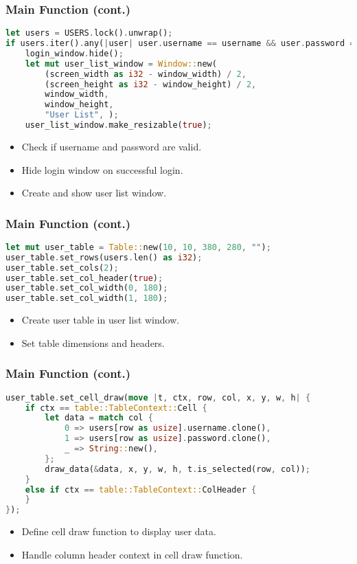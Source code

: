 \documentclass[aspectratio=169, table]{beamer}
\begin{document}
\begin{frame}[fragile]
	\frametitle{Main Function (cont.)}
	\vspace{15pt}
	\begin{lstlisting}[language=Rust]
let users = USERS.lock().unwrap();
if users.iter().any(|user| user.username == username && user.password == password) {
	login_window.hide();
	let mut user_list_window = Window::new(
		(screen_width as i32 - window_width) / 2,
		(screen_height as i32 - window_height) / 2,
		window_width,
		window_height,
		"User List", );
	user_list_window.make_resizable(true);
		\end{lstlisting}
		\begin{itemize}
			\item Check if username and password are valid.
			\item Hide login window on successful login.
			\item Create and show user list window.
		\end{itemize}
	\end{frame}
	
\begin{frame}[fragile]
	\frametitle{Main Function (cont.)}
	\begin{lstlisting}[language=Rust]
let mut user_table = Table::new(10, 10, 380, 280, "");
user_table.set_rows(users.len() as i32);
user_table.set_cols(2);
user_table.set_col_header(true);
user_table.set_col_width(0, 180);
user_table.set_col_width(1, 180);
		\end{lstlisting}
		\begin{itemize}
			\item Create user table in user list window.
			\item Set table dimensions and headers.
		\end{itemize}
	\end{frame}
	
	\begin{frame}[fragile]
		\frametitle{Main Function (cont.)}
		\begin{lstlisting}[language=Rust]
user_table.set_cell_draw(move |t, ctx, row, col, x, y, w, h| {
	if ctx == table::TableContext::Cell {
		let data = match col {
			0 => users[row as usize].username.clone(),
			1 => users[row as usize].password.clone(),
			_ => String::new(),
		};
		draw_data(&data, x, y, w, h, t.is_selected(row, col));
	} 
	else if ctx == table::TableContext::ColHeader {
	}
});
	\end{lstlisting}
	\begin{itemize}
		\item Define cell draw function to display user data.
		\item Handle column header context in cell draw function.
	\end{itemize}
\end{frame}
\end{document}
